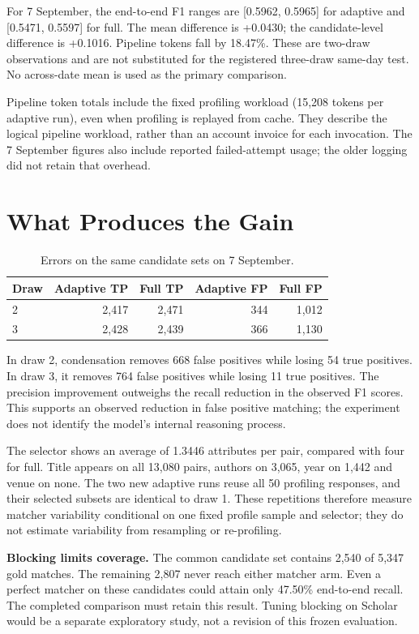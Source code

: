 \documentclass[11pt]{article}
\begin{document}
For 7 September, the end-to-end F1 ranges are [0.5962, 0.5965] for adaptive and
[0.5471, 0.5597] for full. The mean difference is +0.0430; the candidate-level
difference is +0.1016. Pipeline tokens fall by 18.47\%. These are two-draw
observations and are not substituted for the registered three-draw same-day test.
No across-date mean is used as the primary comparison.

Pipeline token totals include the fixed profiling workload (15,208 tokens per
adaptive run), even when profiling is replayed from cache. They describe the
logical pipeline workload, rather than an account invoice for each invocation.
The 7 September figures also include reported failed-attempt usage; the older
logging did not retain that overhead.

\section{What Produces the Gain}
\begin{table}[H]
\centering\small
\begin{tabular}{lrrrr}
\toprule
Draw & Adaptive TP & Full TP & Adaptive FP & Full FP \\
\midrule
2 & 2,417 & 2,471 & 344 & 1,012 \\
3 & 2,428 & 2,439 & 366 & 1,130 \\
\bottomrule
\end{tabular}
\caption{Errors on the same candidate sets on 7 September.}
\end{table}

In draw 2, condensation removes 668 false positives while losing 54 true positives.
In draw 3, it removes 764 false positives while losing 11 true positives. The
precision improvement outweighs the recall reduction in the observed F1 scores.
This supports an observed reduction in false positive matching; the experiment
does not identify the model's internal reasoning process.

The selector shows an average of 1.3446 attributes per pair, compared with four
for full. Title appears on all 13,080 pairs, authors on 3,065, year on 1,442 and
venue on none. The two new adaptive runs reuse all 50 profiling responses, and
their selected subsets are identical to draw 1. These repetitions therefore
measure matcher variability conditional on one fixed profile sample and selector;
they do not estimate variability from resampling or re-profiling.

\textbf{Blocking limits coverage.} The common candidate set contains 2,540 of
5,347 gold matches. The remaining 2,807 never reach either matcher arm. Even a
perfect matcher on these candidates could attain only 47.50\% end-to-end recall.
The completed comparison must retain this result. Tuning blocking on Scholar
would be a separate exploratory study, not a revision of this frozen evaluation.
\end{document}
